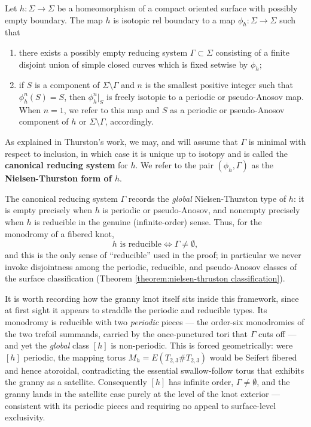 \begin{theorem}\label{theorem:thurston_reducing_system}
Let $h \colon \Sigma \to \Sigma$ be a homeomorphism of a compact oriented surface with possibly empty boundary. The map $h$ is isotopic rel boundary to a map $\phi_h \colon \Sigma \to \Sigma$ such that
\begin{enumerate}
    \item there exists a possibly empty reducing system $\Gamma \subset \Sigma$ consisting of a finite disjoint union of simple closed curves which is fixed setwise by $\phi_h$;
    \item if $S$ is a component of $\Sigma \setminus \Gamma$ and $n$ is the smallest positive integer such that $\phi_h^n(S) = S$, then $\phi_h^n|_S$ is freely isotopic to a periodic or pseudo-Anosov map. When $n = 1$, we refer to this map and $S$ as a periodic or pseudo-Anosov component of $h$ or $\Sigma \setminus \Gamma$, accordingly.
\end{enumerate}
\end{theorem}

As explained in Thurston's work, we may, and will assume that $\Gamma$ is minimal with respect to inclusion, in which case it is unique up to isotopy \cite[Theorem C]{birman1983abelian} and is called the \textbf{canonical reducing system} for $h$. We refer to the pair $(\phi_h, \Gamma)$
as the \textbf{Nielsen-Thurston form of $h$}.

\begin{remark}\label{rem:global_NT_type}
The canonical reducing system $\Gamma$ records the \emph{global} Nielsen-Thurston type of $h$: it is empty precisely when $h$ is periodic or pseudo-Anosov, and nonempty precisely when $h$ is reducible in the genuine (infinite-order) sense. Thus, for the monodromy of a fibered knot,
\[
h \text{ is reducible} \iff \Gamma \neq \emptyset,
\]
and this is the only sense of ``reducible'' used in the proof; in particular we never invoke disjointness among the periodic, reducible, and pseudo-Anosov classes of the surface classification (Theorem \ref{theorem:nielsen-thruston classification}).

It is worth recording how the granny knot itself sits inside this framework, since at first sight it appears to straddle the periodic and reducible types. Its monodromy is reducible with two \emph{periodic} pieces --- the order-six monodromies of the two trefoil summands, carried by the once-punctured tori that $\Gamma$ cuts off --- and yet the \emph{global} class $[h]$ is non-periodic. This is forced geometrically: were $[h]$ periodic, the mapping torus $M_h = E(T_{2,3}\# T_{2,3})$ would be Seifert fibered and hence atoroidal, contradicting the essential swallow-follow torus that exhibits the granny as a satellite. Consequently $[h]$ has infinite order, $\Gamma \neq \emptyset$, and the granny lands in the satellite case purely at the level of the knot exterior --- consistent with its periodic pieces and requiring no appeal to surface-level exclusivity.
\end{remark}

